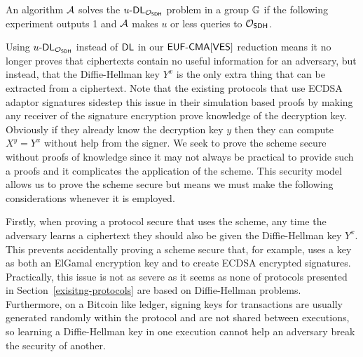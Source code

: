 \begin{definition}
  An algorithm $\mathcal{A}$ solves the $u\text{-}\textsf{DL}_{\mathcal{O}_{\textsf{SDH}}}$ problem in a group $\mathbb{G}$ if the following experiment outputs 1 and $\mathcal{A}$ makes $u$ or less queries to $\mathcal{O}_{\textsf{SDH}}$.
  \begin{center}
  \end{center}
\end{definition}

Using $u\text{-}\textsf{DL}_{\mathcal{O}_{\textsf{SDH}}}$ instead of $\textsf{DL}$ in our $\textsf{EUF-CMA}[\textsf{VES}]$ reduction means it no longer proves that ciphertexts contain no useful information for an adversary, but instead, that the Diffie-Hellman key $Y^x$ is the only extra thing that can be extracted from a ciphertext.
Note that the existing protocols that use ECDSA adaptor signatures sidestep this issue in their simulation based proofs by making any receiver of the signature encryption prove knowledge of the decryption key.
Obviously if they already know the decryption key $y$ then they can compute $X^y = Y^x$ without help from the signer.
We seek to prove the scheme secure without proofs of knowledge since it may not always be practical to provide such a proofs and it complicates the application of the scheme.
This security model allows us to prove the scheme secure but means we must make the following considerations whenever it is employed.

Firstly, when proving a protocol secure that uses the scheme, any time the adversary learns a ciphertext they should also be given the Diffie-Hellman key $Y^x$.
This prevents accidentally proving a scheme secure that, for example, uses a key as both an ElGamal encryption key and to create ECDSA encrypted signatures.
Practically, this issue is not as severe as it seems as none of protocols presented in Section~\ref{exisitng-protocols} are based on Diffie-Hellman problems.
Furthermore, on a Bitcoin like ledger, signing keys for transactions are usually generated randomly within the protocol and are not shared between executions, so learning a Diffie-Hellman key in one execution cannot help an adversary break the security of another.

